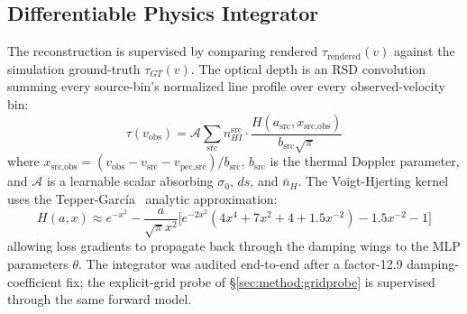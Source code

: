 \subsection{Differentiable Physics Integrator}
The reconstruction is supervised by comparing rendered $\tau_{\text{rendered}}(v)$ against the simulation ground-truth $\tau_{GT}(v)$. The optical depth is an RSD convolution summing every source-bin's normalized line profile over every observed-velocity bin:
\begin{equation}
\tau(v_{\text{obs}}) = \mathcal{A} \sum_{\text{src}} n_{HI}^{\text{src}} \cdot \frac{H(a_{\text{src}}, x_{\text{src,obs}})}{b_{\text{src}}\sqrt{\pi}}
\end{equation}
where $x_{\text{src,obs}} = (v_{\text{obs}} - v_{\text{src}} - v_{\text{pec},\text{src}}) / b_{\text{src}}$, $b_{\text{src}}$ is the thermal Doppler parameter, and $\mathcal{A}$ is a learnable scalar absorbing $\sigma_0$, $ds$, and $\bar{n}_H$. The Voigt-Hjerting kernel uses the Tepper-Garc\'ia~\cite{tepper2006voigt} analytic approximation:
\begin{equation}
H(a, x) \approx e^{-x^2} - \frac{a}{\sqrt{\pi} x^2} \big[ e^{-2x^2} (4x^4 + 7x^2 + 4 + 1.5x^{-2}) - 1.5x^{-2} - 1 \big]
\end{equation}
allowing loss gradients to propagate back through the damping wings to the MLP parameters $\theta$. The integrator was audited end-to-end after a factor-12.9 damping-coefficient fix; the explicit-grid probe of \S\ref{sec:method:gridprobe} is supervised through the same forward model.

